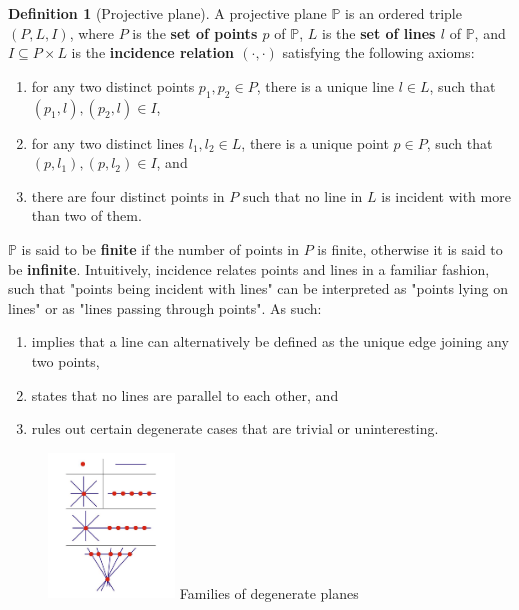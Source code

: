 \documentclass{report}
\renewcommand{\P}{\mathbb{P}}
\theoremstyle{definition}\newtheorem*{definition}{Definition}
\theoremstyle{definition}\newtheorem*{example}{Example}
\theoremstyle{remark}\newtheorem*{remark}{Remark}
\begin{document}
\begin{definition}[Projective plane]
A projective plane $ \P $ is an ordered triple $ (P, L, I) $, where $ P $ is the \textbf{set of points $ p $} of $ \P $, $ L $ is the \textbf{set of lines $ l $} of $ \P $, and $ I \subseteq P \times L $ is the \textbf{incidence relation $ (\cdot, \cdot) $} satisfying the following axioms:
\begin{enumerate}[label=(P\arabic*)]
  \item for any two distinct points $ p_1, p_2 \in P $, there is a unique line $ l \in L $, such that $ (p_1, l), (p_2, l) \in I $,
  \item for any two distinct lines $ l_1, l_2 \in L $, there is a unique point $ p \in P $, such that $ (p, l_1), (p, l_2) \in I $, and
  \item there are four distinct points in $ P $ such that no line in $ L $ is incident with more than two of them.
\end{enumerate}
\end{definition}
$ \P $ is said to be \textbf{finite} if the number of points in $ P $ is finite, otherwise it is said to be \textbf{infinite}. Intuitively, incidence relates points and lines in a familiar fashion, such that "points being incident with lines" can be interpreted as "points lying on lines" or as "lines passing through points". As such:
\begin{enumerate}[label=(P\arabic*)]
  \item implies that a line can alternatively be defined as the unique edge joining any two points,
  \item states that no lines are parallel to each other, and
  \item rules out certain degenerate cases that are trivial or uninteresting.
\end{enumerate}

\pagebreak

\begin{figure}
\includegraphics[width=0.3\textwidth]{degenerate.jpg}
Families of degenerate planes
\end{figure}
\end{document}
